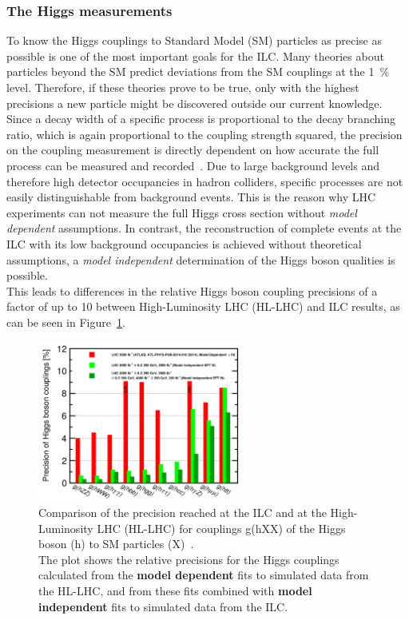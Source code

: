 \subsubsection{The Higgs measurements}
To know the Higgs couplings to Standard Model (SM) particles as precise as possible is one of the most important goals for the ILC.
Many theories about particles beyond the SM predict deviations from the SM couplings at the \SI{1}{\percent} level.
Therefore, if these theories prove to be true, only with the highest precisions a new particle might be discovered outside our current knowledge.\\
Since a decay width of a specific process is proportional to the decay branching ratio, which is again proportional to the coupling strength squared, the precision on the coupling measurement is directly dependent on how accurate the full process can be measured and recorded~\cite{PhysicsCase}.
Due to large background levels and therefore high detector occupancies in hadron colliders, specific processes are not easily distinguishable from background events.
This is the reason why LHC experiments can not measure the full Higgs cross section without \textit{model dependent} assumptions.
In contrast, the reconstruction of complete events at the ILC with its low background occupancies is achieved without theoretical assumptions, a \textit{model independent} determination of the Higgs boson qualities is possible.\\
This leads to differences in the relative Higgs boson coupling precisions of a factor of up to 10 between High-Luminosity LHC (HL-LHC) and ILC results, as can be seen in Figure~\ref{fig:Higgs_couplings}.
\begin{figure}[h]
\centering
\includegraphics[width=0.6\textwidth]{Figures/Higgs_couplings.png}
\caption[Higgs coupling precisions]{Comparison of the precision reached at the ILC and at the High-Luminosity LHC (HL-LHC) for couplings g(hXX) of the Higgs boson (h) to SM particles (X)~\cite[p. 17]{PhysicsCase}.\\
The plot shows the relative precisions for the Higgs couplings calculated from the \textbf{model dependent} fits to simulated data from the HL-LHC, and from these fits combined with \textbf{model independent} fits to simulated data from the ILC.}
\label{fig:Higgs_couplings}
\end{figure}

